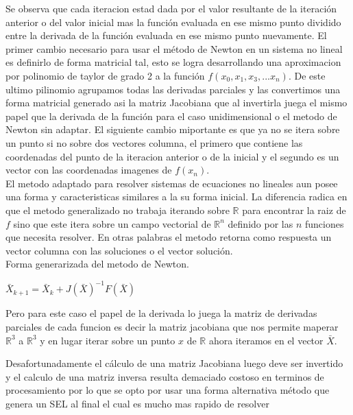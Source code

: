 \documentclass[11pt]{article}
\begin{document}
Se observa que cada iteracion estad dada por el valor resultante de la iteración anterior o del valor inicial mas la función evaluada en ese mismo punto dividido entre la derivada de la función evaluada en ese mismo punto nuevamente. El primer cambio necesario para usar el método de Newton en un sistema no lineal es definirlo de forma matricial tal, esto se logra desarrollando una aproximacion por polinomio de taylor de grado 2 a la función $f(x_{0},x_{1},x_{3},...x_{n})$. De este ultimo pilinomio agrupamos todas las derivadas parciales y las convertimos una forma matricial generado asi la matriz Jacobiana que al invertirla  juega el mismo papel que la derivada de la función para el caso unidimensional o el metodo de Newton sin adaptar. El siguiente cambio miportante es que ya no se itera sobre un punto si no sobre dos vectores columna, el primero que contiene las coordenadas del punto de la iteracion anterior o de la inicial y el segundo es un vector con las coordenadas imagenes de $f(x_{n})$.\\
El metodo adaptado para resolver sistemas de ecuaciones no lineales aun posee una forma y caracteristicas similares a la su forma inicial. La diferencia radica en que el metodo generalizado no trabaja iterando sobre $\mathbb{R}$ para encontrar la raiz de $f$ sino que este itera sobre un campo vectorial de $\mathbb{R}^n$ definido por las $n$ funciones que necesita resolver. En otras palabras el metodo retorna como respuesta un vector columna con las soluciones o el vector solución.\\

Forma generarizada del metodo de Newton.
 
\begin{center}
$\bar{X}_{k+1} = \bar{X}_{k} + {J(\bar{X})}^{-1}F(\bar{X})  \label{eq:2}$
\end{center}

Pero para este caso el papel de la derivada lo juega la matriz de derivadas parciales de cada funcion es decir la matriz jacobiana que nos permite maperar  $\mathbb{R}^3$ a $\mathbb{R}^3$ y en lugar iterar sobre un punto $x$ de $\mathbb{R}$  ahora iteramos en el vector $\bar{X}$. 

Desafortunadamente el cálculo de una matriz Jacobiana luego deve ser invertido y el calculo de una matriz inversa resulta demaciado costoso en terminos de procesamiento por lo que se opto por usar una forma alternativa método que genera un SEL al final el cual es mucho mas rapido de resolver\\
\end{document}
